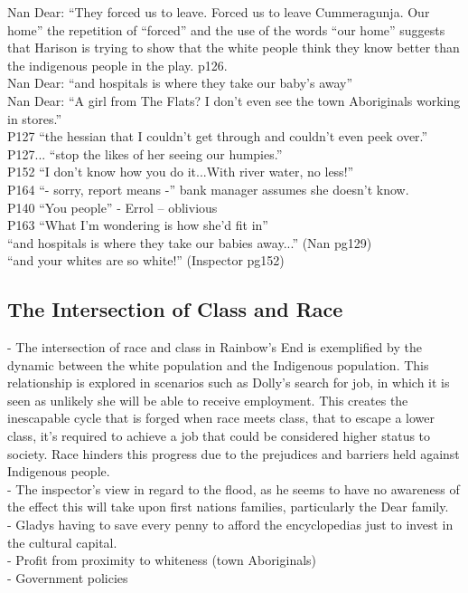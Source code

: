 \documentclass[a4paper]{article}
\begin{document}
Nan Dear: “They forced us to leave. Forced us to leave Cummeragunja. Our home” the repetition of “forced” and the use of the words “our home” suggests that Harison is trying to show that the white people think they know better than the indigenous people in the play. p126. \\
Nan Dear: “and hospitals is where they take our baby’s away” \\
Nan Dear: “A girl from The Flats? I don’t even see the town Aboriginals working in stores.” \\
P127 “the hessian that I couldn’t get through and couldn’t even peek over.” \\
P127... “stop the likes of her seeing our humpies.” \\

P152 “I don’t know how you do it...With river water, no less!” \\
P164 “- sorry, report means -” bank manager assumes she doesn’t know. \\
P140 “You people” - Errol – oblivious \\
P163 “What I'm wondering is how she’d fit in” \\
“and hospitals is where they take our babies away...” (Nan pg129) \\
“and your whites are so white!” (Inspector pg152) \\

\subsection{The Intersection of Class and Race}
- The intersection of race and class in Rainbow’s End is exemplified by the dynamic between the white population and the Indigenous population. This relationship is explored in scenarios such as Dolly’s search for job, in which it is seen as unlikely she will be able to receive employment. This creates the inescapable cycle that is forged when race meets class, that to escape a lower class, it’s required to achieve a job that could be considered higher status to society. Race hinders this progress due to the prejudices and barriers held against Indigenous people. \\
- The inspector's view in regard to the flood, as he seems to have no awareness of the effect this will take upon first nations families, particularly the Dear family. \\
- Gladys having to save every penny to afford the encyclopedias just to invest in the cultural capital. \\
- Profit from proximity to whiteness (town Aboriginals) \\
- Government policies \\
\end{document}
